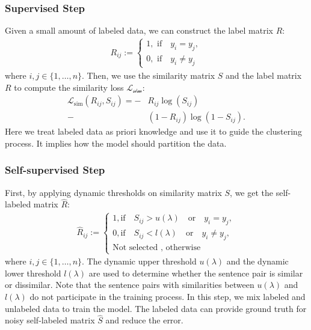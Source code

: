 \documentclass[letterpaper]{article} \usepackage{aaai20}  \usepackage{times}  \usepackage{helvet} \usepackage{courier}  \usepackage[hyphens]{url}  \usepackage{graphicx} \urlstyle{rm} \def\UrlFont{\rm}  \usepackage{graphicx}  \frenchspacing  \setlength{\pdfpagewidth}{8.5in}  \setlength{\pdfpageheight}{11in}
\begin{document}
\subsubsection{Supervised Step} Given a small amount of labeled data, we can construct the label matrix $R$:
\begin{align}
  R_{ij} :=\begin{cases}
               1, \text{ if} \quad y_{i} = y_{j}, \\
               0, \text{ if} \quad y_{i} \neq y_{j}
            \end{cases}
\end{align}
where $i, j \in \{1, \dots, n \}$. Then, we use the similarity matrix $S$ and the label matrix $R$ to compute the similarity loss  $\mathcal{L_{\text{sim}}}$: 
\begin{equation}
\begin{aligned}
    \mathcal{L}_{\text{sim}}(R_{ij}, S_{ij}  ) = -& R_{ij} \log(S_{ij}) \\
     - &(1- R_{ij}) \log(1-S_{ij}).
\end{aligned}
\end{equation}
Here we treat labeled data as priori knowledge and use it to guide the clustering process. It implies how the model should partition the data. 

\subsubsection{Self-supervised Step} First, by applying dynamic thresholds on similarity matrix $S$, we get the self-labeled matrix $\hat R$:
\begin{align}
 \hat R_{ij} :=\begin{cases}
               1, \text{if} \quad S_{ij}  > u(\lambda) \quad \text{or} \quad y_i = y_j,  \\
               0, \text{if} \quad S_{ij}  < l(\lambda) \quad \text{or} \quad y_i \neq y_j,  \\
               \text{Not selected , otherwise}
            \end{cases}
\end{align}
where $i, j \in \{1, \dots, n \}$. The dynamic upper threshold $u(\lambda)$ and the dynamic lower threshold $l(\lambda)$ are used to determine whether the sentence pair is similar or dissimilar. Note that the sentence pairs with similarities between $u(\lambda)$ and $l(\lambda)$ do not participate in the training process. In this step, we mix labeled and unlabeled data to train the model. The labeled data can provide ground truth for noisy self-labeled matrix $\hat S$ and reduce the error.
\end{document}
